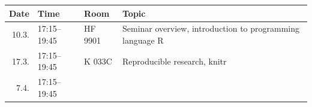 \documentclass[]{article}
\begin{document}
\begin{longtable}[c]{@{}rlll@{}}
\toprule
\begin{minipage}[b]{0.09\columnwidth}\raggedleft\strut
Date
\strut\end{minipage} &
\begin{minipage}[b]{0.15\columnwidth}\raggedright\strut
Time
\strut\end{minipage} &
\begin{minipage}[b]{0.13\columnwidth}\raggedright\strut
Room
\strut\end{minipage} &
\begin{minipage}[b]{0.51\columnwidth}\raggedright\strut
Topic
\strut\end{minipage}\tabularnewline
\midrule
\endhead
\begin{minipage}[t]{0.09\columnwidth}\raggedleft\strut
10.3.
\strut\end{minipage} &
\begin{minipage}[t]{0.15\columnwidth}\raggedright\strut
17:15--19:45
\strut\end{minipage} &
\begin{minipage}[t]{0.13\columnwidth}\raggedright\strut
HF 9901
\strut\end{minipage} &
\begin{minipage}[t]{0.51\columnwidth}\raggedright\strut
Seminar overview, introduction to programming language R
\strut\end{minipage}\tabularnewline
\begin{minipage}[t]{0.09\columnwidth}\raggedleft\strut
17.3.
\strut\end{minipage} &
\begin{minipage}[t]{0.15\columnwidth}\raggedright\strut
17:15--19:45
\strut\end{minipage} &
\begin{minipage}[t]{0.13\columnwidth}\raggedright\strut
K 033C
\strut\end{minipage} &
\begin{minipage}[t]{0.51\columnwidth}\raggedright\strut
Reproducible research, knitr
\strut\end{minipage}\tabularnewline
\begin{minipage}[t]{0.09\columnwidth}\raggedleft\strut
7.4.
\strut\end{minipage} &
\begin{minipage}[t]{0.15\columnwidth}\raggedright\strut
17:15--19:45
\strut\end{minipage} &
\begin{minipage}[t]{0.13\columnwidth}\raggedright\strut

\end{minipage}
\end{longtable}
\end{document}
